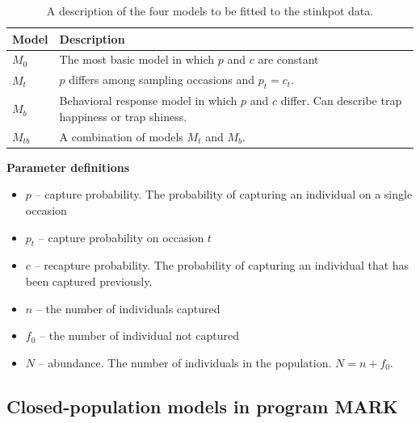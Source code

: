 \documentclass[12pt]{article}\usepackage[]{graphicx}\usepackage[]{color}
\begin{document}
\begin{table}[h!]
  \centering
  \caption{A description of the four models to be fitted to the
    stinkpot data.}
  \footnotesize
  \begin{tabular}[h!]{ll}
    \hline
    Model & Description \\
    \hline
    $M_0$ & The most basic model in which $p$ and $c$ are constant \\
    $M_t$ & $p$ differs among sampling occasions and $p_t=c_t$. \\
    $M_b$ & Behavioral response model in which $p$ and $c$
            differ. Can describe trap happiness or trap shiness. \\
    $M_{tb}$ & A combination of models $M_t$ and $M_b$. \\
    \hline
  \end{tabular}
  \label{tab:Otis}
\end{table}





{\bf Parameter definitions}
\begin{itemize}
  \item $p$ -- capture probability. The probability of capturing an
    individual on a single occasion
  \item $p_t$ -- capture probability on occasion $t$
  \item $c$ -- recapture probability. The probability of capturing an
    individual that has been captured previously.
  \item $n$ -- the number of individuals captured
  \item $f_0$ -- the number of individual not captured
  \item $N$ -- abundance. The number of individuals in the
    population. $N=n+f_0$. 
\end{itemize}




\subsection*{Closed-population models in program MARK}
\end{document}
